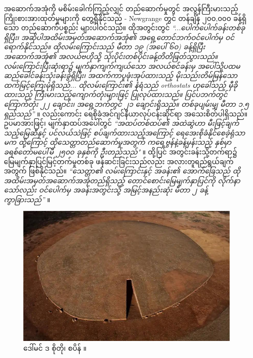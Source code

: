 \documentclass[10pt,twocolumn,letterpaper]{article}
\begin{document}
အဆောက်အအုံကို မစိမ်းခေါက်ကြည့်လျှင် တည်ဆောက်မှုတွင် အလွန်ကြီးမားသည့် ကြိုးစားအားထုတ်မှုများကို တွေ့ရှိနိုင်သည် - Newgrange တွင် တန်ချိန် ၂၀၀,၀၀၀ ခန့်ရှိသော တည်ဆောက်ပစ္စည်း များပါဝင်သည်။ ထိုအတွင်းတွင် \textit{“...ပေါက်ပေါက်ခန်းတစ်ခုရှိပြီး၊ အဆိုပါအထိမ်းအမှတ်အဆောက်အအုံ၏ အရှေ့တောင်ဘက်ဝင်ပေါက်မှ ဝင်ရောက်နိုင်သည်။ ထိုလမ်းကြောင်းသည် မီတာ ၁၉ (အပေါ် ၆၀) ခန့်ရှိပြီး အဆောက်အအုံ၏ အလယ်ဗဟိုသို့ သုံးပိုင်းတစ်ပိုင်းခန့်တိတိဖြတ်သွားသည်။ လမ်းကြောင်းပြီးဆုံးရာ၌ မျက်နှာကျက်ကျယ်သော အလယ်စင်ခန်းမှ အပေါ်သို့ပထမ ဆည်ခေါင်ခန်းသုံးခန်းခွဲရှိပြီး၊ အထက်ကာပူဖုံးအုပ်ထားသည့် မိုးသည်းတိမ်မြန်သော ထက်မြင့်ကြေးမုံရှိသည်... ထိုလမ်းကြောင်း၏ နံရံသည် orthostats ဟုခေါ်သည့် မှီခိုထားသည့် ကြီးမားသည့်ကျောက်တုံးများဖြင့် ပြုလုပ်ထားသည်။ ပြင်ပဘက်တွင် ကြောက်တုံး ၂၂ ချောင်း၊ အရှေ့ဘက်တွင် ၂၁ ချောင်းရှိသည်။ တစ်ခုပျမ်းမျှ မီတာ ၁.၅ ရှည်သည်”} \cite{70}။ လည်းကောင်း ရေစိုခံအင်ဂျင်နီယာလုပ်ငန်းဆိုင်ရာ အသေးစိတ်ပါရှိသည်။ ဥပမာအားဖြင့်၊ မျက်နှာထပ်အပေါ်တွင် \textit{“အထပ်တစ်ထပ်၏ အထဲဆွဲဟာ မီးဖြင့်ချက်သည့်မြေဆီနှင့် ပင်လယ်သဲဖြင့် စပ်ချက်ထားသည့်အကြောင့် ရေအေးစိုခံနိုင်စေခဲ့ရုံသာမက ထို့ကြောင့် ထိုသေတ္တာတည်ဆောက်မှုအတွက် ကရေ့ဗွန်နဲ့ခန့်မှန်းသည့် နှစ်မှာ ခရစ်တော်မပေါ်မီ ၂၅၀၀ ခုနှစ်ကို ဦးတည်သည်"} \cite{71}။ ထို့ပြင် အတွင်းခန်းသို့တက်ရာ၌ မြေမျက်နှာပြင်မြင့်တက်မှုတစ်ခု ဖန်ဆင်းခြင်းသည်လည်း အလားတူရည်ရွယ်ချက်အတွက် ဖြစ်နိုင်သည်။ \textit{“သေတ္တာ၏ လမ်းကြောင်းနှင့် အခန်း၏ အောက်ခြေသည် ထိုအထိမ်းအမှတ်အဆောက်အအုံတည်ရှိသည့် တောင်စောင်းမြေမျက်နှာပြင်ကို လိုက်နာသော်လည်း ဝင်ပေါက်မှ အခန်းအတွင်းသို့ အမြင့်အနည်းဆုံး မီတာ ၂ ခန့်ကွာခြားသည်”} \cite{71}။

\begin{figure}[b]

\begin{center}
   \includegraphics[width=1\linewidth]{dolmen.jpg}
\end{center}
   \caption{ဒေါ်မင် ဒ စိုတို၊ စပိန် \cite{53}။}
\label{fig:9}
\label{fig:onecol}
\end{figure}
\end{document}
